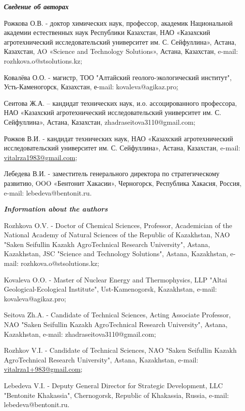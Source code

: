 \begin{info}
\hspace{1em}\emph{{\bfseries Сведение об авторах}}

Рожкова О.В. - доктор химических наук, профессор, академик
Национальной академии естественных наук Республики Казахстан, НАО
«Казахский агротехнический исследовательский университет им. С.
Сейфуллина», Астана, Казахстан, AO «Science and Technology Solutions»,
Астана, Казахстан, e-mail: rozhkova.o@stsolutions.kz;

Ковалёва О.О. - магистр, ТОО "Алтайский геолого-экологический
институт", Усть-Каменогорск, Казахстан, е-mail:
kovaleva@agikaz.pro\ul{;}

Сеитова Ж.А. -- кандидат технических наук, и.о. ассоцированного
профессора, НАО «Казахский агротехнический исследовательский
университет им. С. Сейфуллина», Астана, Казахстан,
zhadraseitova3110@gmail.com;

Рожков В.И. - кандидат технических наук, НАО «Казахский
агротехнический исследовательский университет им. С. Сейфуллина»,
Астана, Казахстан, e-mail:
\href{mailto:vitalrza1983@gmail.com}{vitalrza1983@gmail.com};

Лебедева В.И. - заместитель генерального директора по стратегическому
развитию, OOO «Бентонит Хакасии», Черногорск, Республика Хакасия,
Россия, e-mail: lebedeva@bentonit.ru.

\hspace{1em}\emph{{\bfseries Information about the authors}}

Rozhkova O.V. - Doctor of Chemical Sciences, Professor, Academician of
the National Academy of Natural Sciences of the Republic of
Kazakhstan, NAO "Saken Seifullin Kazakh AgroTechnical Research
University", Astana, Kazakhstan, JSC "Science and Technology
Solutions", Astana, Kazakhstan, e-mail: rozhkova.o@stsolutions.kz;

Kovaleva O.O. - Master of Nuclear Energy and Thermophysics, LLP "Altai
Geological-Ecological Institute", Ust-Kamenogorsk, Kazakhstan, e-mail:
kovaleva@agikaz.pro;

Seitova Zh.A. - Candidate of Technical Sciences, Acting Associate
Professor, NAO "Saken Seifullin Kazakh AgroTechnical Research
University", Astana, Kazakhstan, e-mail: zhadraseitova3110@gmail.com;

Rozhkov V.I. - Candidate of Technical Sciences, NAO "Saken Seifullin
Kazakh AgroTechnical Research University", Astana, Kazakhstan, e-mail:
\href{mailto:vitalrza1983@gmail.com}{vitalrza1+983@gmail.com};

Lebedeva V.I. - Deputy General Director for Strategic Development, LLC
"Bentonite Khakassia", Chernogorsk, Republic of Khakassia, Russia,
e-mail: lebedeva@bentonit.ru.
\end{info}

